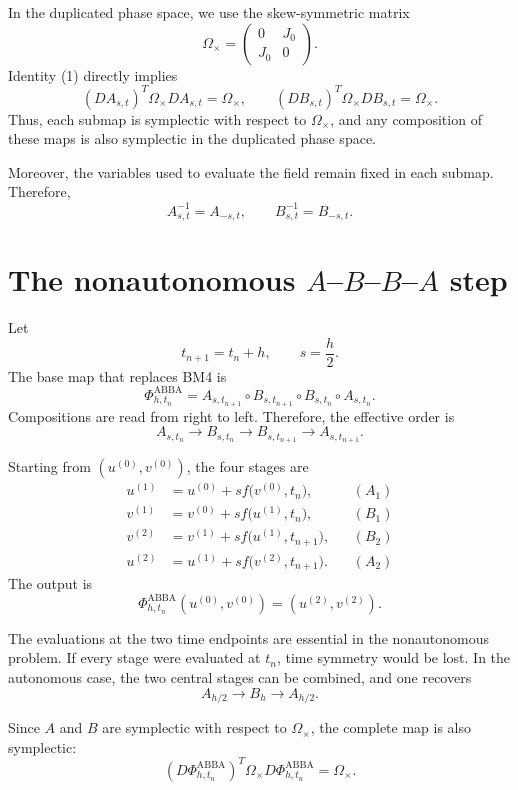 \documentclass[11pt,a4paper]{article}
\newcommand{\Om}{\Omega_{\times}}
\newcommand{\PhiAB}{\Phi^{\mathrm{ABBA}}_{h,t_n}}
\begin{document}
In the duplicated phase space, we use the skew-symmetric matrix
\[
 \Om=
 \begin{pmatrix}
  0&J_0\\
  J_0&0
 \end{pmatrix}.
\]
Identity (1) directly implies
\[
 (DA_{s,t})^T\Om DA_{s,t}=\Om,
 \qquad
 (DB_{s,t})^T\Om DB_{s,t}=\Om.
\]
Thus, each submap is symplectic with respect to $\Om$, and any composition of these maps is
also symplectic in the duplicated phase space.

Moreover, the variables used to evaluate the field remain fixed in each submap. Therefore,
\[
 \boxed{A_{s,t}^{-1}=A_{-s,t},\qquad B_{s,t}^{-1}=B_{-s,t}.} \tag{5}
\]

\section{The nonautonomous \texorpdfstring{$A$--$B$--$B$--$A$}{A-B-B-A} step}

Let
\[
 t_{n+1}=t_n+h,
 \qquad
 s=\frac h2.
\]
The base map that replaces BM4 is
\[
 \boxed{
 \PhiAB
 =A_{s,t_{n+1}}
  \circ B_{s,t_{n+1}}
  \circ B_{s,t_n}
  \circ A_{s,t_n}.
 } \tag{6}
\]
Compositions are read from right to left. Therefore, the effective order is
\[
 A_{s,t_n}\longrightarrow B_{s,t_n}
 \longrightarrow B_{s,t_{n+1}}\longrightarrow A_{s,t_{n+1}}.
\]

Starting from $(u^{(0)},v^{(0)})$, the four stages are
\begin{align}
 u^{(1)}
 &=u^{(0)}+s f\bigl(v^{(0)},t_n\bigr), &&(A_1) \tag{7a}\\
 v^{(1)}
 &=v^{(0)}+s f\bigl(u^{(1)},t_n\bigr), &&(B_1) \tag{7b}\\
 v^{(2)}
 &=v^{(1)}+s f\bigl(u^{(1)},t_{n+1}\bigr), &&(B_2) \tag{7c}\\
 u^{(2)}
 &=u^{(1)}+s f\bigl(v^{(2)},t_{n+1}\bigr). &&(A_2) \tag{7d}
\end{align}
The output is
\[
 \PhiAB(u^{(0)},v^{(0)})=(u^{(2)},v^{(2)}).
\]

The evaluations at the two time endpoints are essential in the nonautonomous problem.
If every stage were evaluated at $t_n$, time symmetry would be lost. In the autonomous
case, the two central stages can be combined, and one recovers
\[
 A_{h/2}\longrightarrow B_h\longrightarrow A_{h/2}.
\]

Since $A$ and $B$ are symplectic with respect to $\Om$, the complete map is also symplectic:
\[
 \boxed{
 (D\PhiAB)^T\Om D\PhiAB=\Om.
 } \tag{8}
\]
\end{document}
